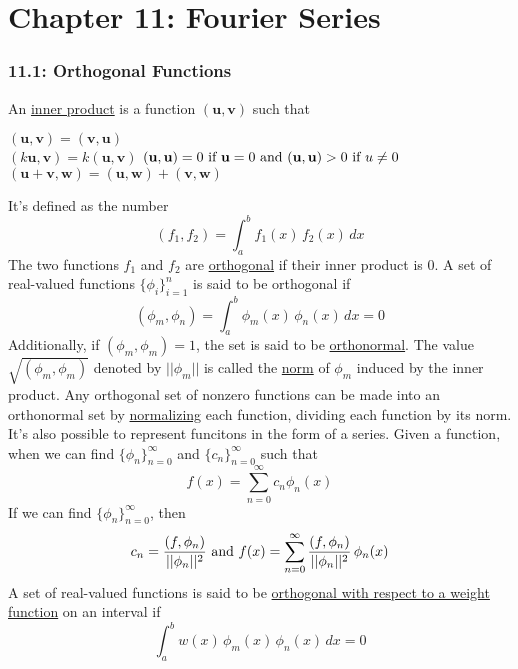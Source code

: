\documentclass{article}
\begin{document}
\part*{Chapter 11: Fourier Series}
\section*{11.1: Orthogonal Functions}
An \underline{inner product} is a function \((\textbf{u},\textbf{v})\) such that
\begin{center}
\begin{multicols}{2}
    \((\textbf{u},\textbf{v})=(\textbf{v},\textbf{u})\)\\
    \((k\textbf{u},\textbf{v})=k(\textbf{u},\textbf{v})\)
    \((\textbf{u},\textbf{u})=0\textnormal{ if }\textbf{u}=0\textnormal{ and }(\textbf{u},\textbf{u})>0\textnormal{ if }u\neq 0\)
    \((\textbf{u}+\textbf{v},\textbf{w})=(\textbf{u},\textbf{w})+(\textbf{v},\textbf{w})\)
\end{multicols}
\end{center}
It's defined as the number
\[(f_1, f_2)=\int_a^bf_1(x)\,f_2(x)\,dx\]
The two functions \(f_1\) and \(f_2\) are \underline{orthogonal} if their inner product is 0. A set of real-valued functions \(\{\phi_i\}_{i=1}^n\) is said to be orthogonal if
\[(\phi_m,\phi_n)=\int_a^b\phi_m(x)\,\phi_n(x)\,dx=0\]
Additionally, if \((\phi_m, \phi_m)=1\), the set is said to be \underline{orthonormal}. The value \(\sqrt{(\phi_m,\phi_m)}\) denoted by \(||\phi_m||\) is called the \underline{norm} of \(\phi_m\) induced by the inner product. Any orthogonal set of nonzero functions can be made into an orthonormal set by \underline{normalizing} each function, dividing each function by its norm. It's also possible to represent funcitons in the form of a series. Given a function, when we can find \(\{\phi_n\}_{n=0}^\infty\) and \(\{c_n\}_{n=0}^\infty\) such that
\[f(x)=\sum_{n=0}^\infty c_n\phi_n(x)\]
If we can find \(\{\phi_n\}_{n=0}^\infty\), then
\[c_n=\frac{(f, \phi_n)}{||\phi_n||^2}\textnormal{ and }f(x)=\sum_{n=0}^\infty\frac{(f, \phi_n)}{||\phi_n||^2}\,\phi_n(x)\]
A set of real-valued functions is said to be \underline{orthogonal with respect to a weight function} on an interval if
\[\int_a^bw(x)\,\phi_m(x)\,\phi_n(x)\,dx=0\]
\end{document}
